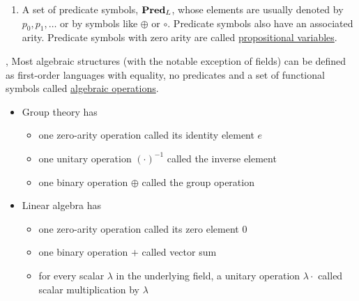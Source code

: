 \begin{definition}
\begin{description}
\begin{enumerate}
      \item A set of predicate symbols, $\operatorname{\mathbf{Pred}}_L$, whose elements are usually denoted by $p_0, p_1, \ldots$ or by symbols like $\oplus$ or $\circ$. Predicate symbols also have an associated arity. Predicate symbols with zero arity are called \uline{propositional variables}.
    \end{enumerate}
  \end{description}
\end{definition}

\begin{example}\label{ex:algebraic_theory_language}\cite[remark 2.1.4]{Leinster2014},\cite[21]{Lectures:logic_programming}
  Most algebraic structures (with the notable exception of fields) can be defined as first-order languages with equality, no predicates and a set of functional symbols called \uline{algebraic operations}.
  \begin{itemize}
    \item Group theory has
    \begin{itemize}
      \item one zero-arity operation called its identity element $e$
      \item one unitary operation $(\cdot)^{-1}$ called the inverse element
      \item one binary operation $\oplus$ called the group operation
    \end{itemize}

    \item Linear algebra has
    \begin{itemize}
      \item one zero-arity operation called its zero element $0$
      \item one binary operation $+$ called vector sum
      \item for every scalar $\lambda$ in the underlying field, a unitary operation $\lambda \cdot$ called scalar multiplication by $\lambda$
    \end{itemize}
  \end{itemize}
\end{example}


